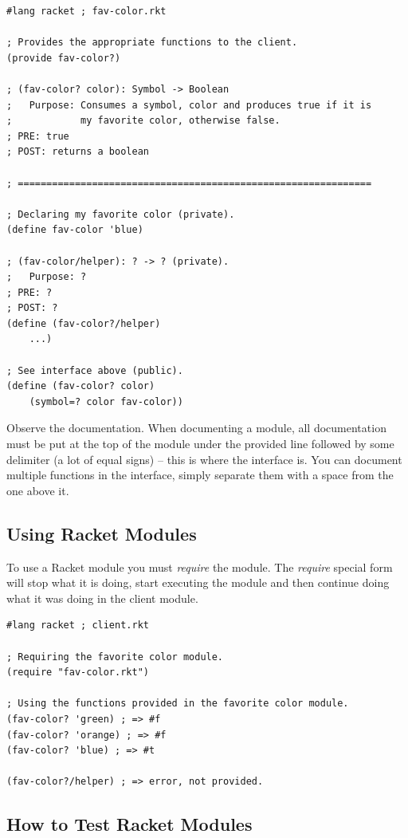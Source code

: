 \documentclass[12pt,extarticle]{article}
\begin{document}
\lstset {
	language=Lisp
}
\begin{lstlisting}
#lang racket ; fav-color.rkt

; Provides the appropriate functions to the client.
(provide fav-color?)

; (fav-color? color): Symbol -> Boolean
;	Purpose: Consumes a symbol, color and produces true if it is
;	         my favorite color, otherwise false.
; PRE: true
; POST: returns a boolean

; ==============================================================

; Declaring my favorite color (private).
(define fav-color 'blue)

; (fav-color/helper): ? -> ? (private).
;	Purpose: ?
; PRE: ?
; POST: ?
(define (fav-color?/helper)
	...)

; See interface above (public).
(define (fav-color? color)
	(symbol=? color fav-color))
\end{lstlisting}

Observe the documentation. When documenting a module, all documentation must be put at the top of the module under the provided line followed by some delimiter (a lot of equal signs) -- this is where the interface is. You can document multiple functions in the interface, simply separate them with a space from the one above it.

\subsection{Using Racket Modules}

To use a Racket module you must \emph{require} the module. The \emph{require} special form will stop what it is doing, start executing the module and then continue doing what it was doing in the client module.

\lstset {
	language=Lisp
}
\begin{lstlisting}
#lang racket ; client.rkt

; Requiring the favorite color module.
(require "fav-color.rkt")

; Using the functions provided in the favorite color module.
(fav-color? 'green) ; => #f
(fav-color? 'orange) ; => #f
(fav-color? 'blue) ; => #t

(fav-color?/helper) ; => error, not provided.
\end{lstlisting}

\subsection{How to Test Racket Modules}
\end{document}
